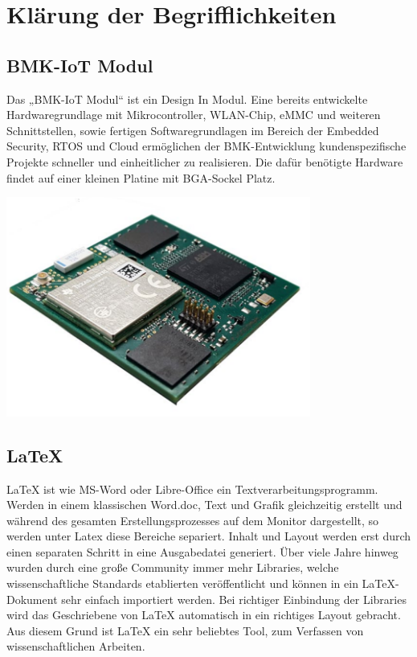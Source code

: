 

\section{Klärung der Begrifflichkeiten}

\subsection{BMK-IoT Modul}
Das „BMK-IoT Modul“ ist ein Design In Modul. Eine bereits entwickelte Hardwaregrundlage mit Mikrocontroller, WLAN-Chip, eMMC und weiteren Schnittstellen, sowie fertigen Softwaregrundlagen im Bereich der Embedded Security, RTOS und Cloud ermöglichen der BMK-Entwicklung kundenspezifische Projekte schneller und einheitlicher zu realisieren.
Die dafür benötigte Hardware findet auf einer kleinen Platine mit BGA-Sockel Platz. 

\begin{center}
\includegraphics[width=10cm]{Bilder/BMK-IOT-MODUL.png}
\end{center}



\subsection{LaTeX}
LaTeX ist wie MS-Word oder Libre-Office ein Textverarbeitungsprogramm. Werden in einem klassischen Word.doc, Text und Grafik gleichzeitig erstellt und während des gesamten Erstellungsprozesses auf dem Monitor dargestellt, so werden unter Latex diese Bereiche separiert. Inhalt und Layout werden erst durch einen separaten Schritt in eine Ausgabedatei generiert. Über viele Jahre hinweg wurden durch eine große Community immer mehr Libraries, welche wissenschaftliche Standards etablierten veröffentlicht und können in ein LaTeX-Dokument sehr einfach importiert werden. Bei richtiger Einbindung der Libraries wird das Geschriebene von LaTeX automatisch in ein richtiges Layout gebracht. Aus diesem Grund ist LaTeX ein sehr beliebtes Tool, zum Verfassen von wissenschaftlichen Arbeiten.

